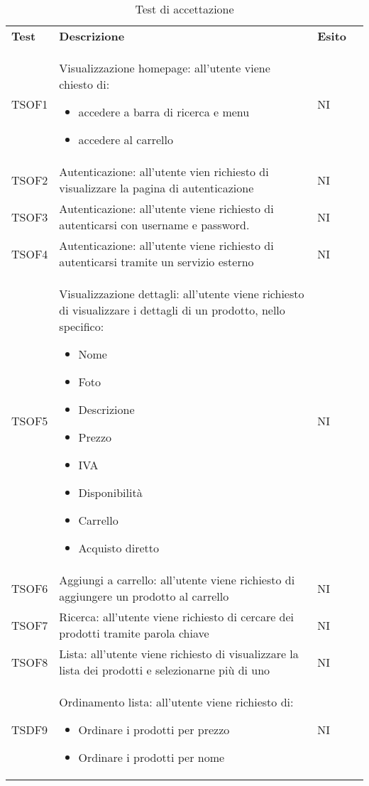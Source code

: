 \begin{center}
    \centering
    \renewcommand{\arraystretch}{1.8}
    \label{tab:TestAccettazione}
    \begin{longtable}[!h]{p{50px} p{245px} p{75px} p{50px}}
        \caption{Test di accettazione} \\           
        \rowcolor{logo!70} \textbf{Test} & \textbf{Descrizione} & \textbf{Esito} \\
        TSOF1   & Visualizzazione homepage: all'utente viene chiesto di: \begin{itemize} \item accedere a barra di ricerca e menu \item accedere al carrello \end{itemize} & NI \\
        TSOF2   & Autenticazione: all'utente vien richiesto di visualizzare la pagina di autenticazione & NI \\
        TSOF3   & Autenticazione: all'utente viene richiesto di autenticarsi con username e password. & NI \\
        TSOF4   & Autenticazione: all'utente viene richiesto di autenticarsi tramite un servizio esterno & NI \\
        TSOF5   & Visualizzazione dettagli: all'utente viene richiesto di visualizzare i dettagli di un prodotto, nello specifico: \begin{itemize} \item Nome \item Foto \item Descrizione \item Prezzo\item IVA \item Disponibilit\`a \item Carrello \item Acquisto diretto \end{itemize} & NI \\
        TSOF6   & Aggiungi a carrello: all'utente viene richiesto di aggiungere un prodotto al carrello & NI \\
        TSOF7   & Ricerca: all'utente viene richiesto di cercare dei prodotti tramite parola chiave & NI \\
        TSOF8   & Lista: all'utente viene richiesto di visualizzare la lista dei prodotti e selezionarne pi\`u di uno & NI \\
        TSDF9   & Ordinamento lista: all'utente viene richiesto di: \begin{itemize} \item Ordinare i prodotti per prezzo \item Ordinare i prodotti per nome \end{itemize}& NI \\

\end{longtable}
\end{center}
